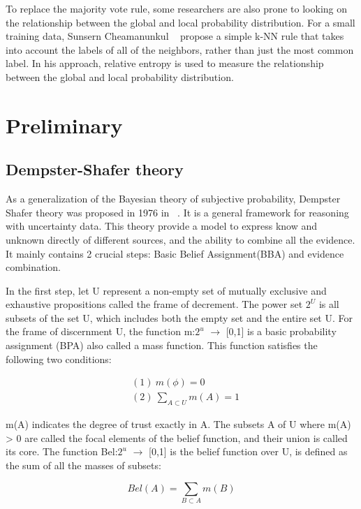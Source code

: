 \documentclass[runningheads]{llncs}
\begin{document}
To replace the majority vote rule, some researchers are also prone to looking on the relationship between the global  and local probability distribution. For a small training data, Sunsern Cheamanunkul ~\cite{ref_article11} propose a simple k-NN rule that takes into account the labels of all of the neighbors, rather than just the most common label. In his approach, relative entropy is used to measure the relationship between the global  and local probability distribution.

\section{Preliminary}
\subsection{Dempster-Shafer theory}
As a generalization of the Bayesian theory of subjective probability, Dempster Shafer theory was proposed in 1976 in ~\cite{ref_article10}. It is a general framework for reasoning with uncertainty data. This theory provide a model to express know and unknown directly of different sources, and the ability to combine all the evidence. It mainly contains 2 crucial steps: Basic Belief Assignment(BBA) and evidence combination.

In the first step, let U represent a non-empty set of mutually exclusive and exhaustive propositions called the frame of decrement. The power set $2^{U}$ is all subsets of the set U, which includes both the empty set  and the entire set U. For the frame of discernment U, the function m:$2^{u}$ $\rightarrow$ [0,1] is a basic probability assignment (BPA) also called a mass function. This function satisfies the following two conditions: 

\begin{equation}
\begin{split}
&(1)\ m(\phi) = 0\\&(2)\ \sum_{A\subset U}m(A) = 1
\end{split}
\end{equation}

m(A) indicates the degree of trust exactly in A. The subsets A of U where m(A) > 0 are called the focal elements of the belief function, and their union is called its core. The function Bel:$2^{u}$ $\rightarrow$ [0,1] is the belief function over U, is defined as the sum of all the masses of subsets:

\begin{equation}
Bel(A) = \sum_{B\subset A}m(B)
\end{equation}
\end{document}
